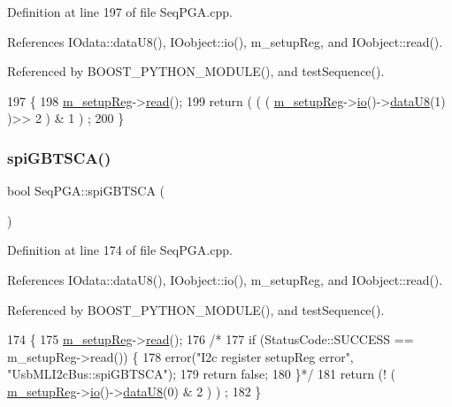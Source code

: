 Definition at line 197 of file Seq\+P\+G\+A.\+cpp.



References I\+Odata\+::data\+U8(), I\+Oobject\+::io(), m\+\_\+setup\+Reg, and I\+Oobject\+::read().



Referenced by B\+O\+O\+S\+T\+\_\+\+P\+Y\+T\+H\+O\+N\+\_\+\+M\+O\+D\+U\+L\+E(), and test\+Sequence().


\begin{DoxyCode}
197                        \{
198   \hyperlink{classSeqPGA_a03269241e7fc26493cd0595beda334c2}{m\_setupReg}->\hyperlink{classIOobject_aa07610c11963b1db6710e3c76ceea456}{read}();
199   \textcolor{keywordflow}{return} ( ( ( \hyperlink{classSeqPGA_a03269241e7fc26493cd0595beda334c2}{m\_setupReg}->\hyperlink{classIOobject_af04fb94137c3d86849f478ac5afab5d1}{io}()->\hyperlink{classIOdata_a75e9c318dbac3a39402179070943d4bc}{dataU8}(1) )>> 2 ) & 1 ) ;
200 \}
\end{DoxyCode}
\mbox{\label{classSeqPGA_a2eadc7868d61ff79ea566b3fbfd977a5}} 
\subsubsection{\texorpdfstring{spi\+G\+B\+T\+S\+C\+A()}{spiGBTSCA()}}
{\footnotesize\ttfamily bool Seq\+P\+G\+A\+::spi\+G\+B\+T\+S\+CA (\begin{DoxyParamCaption}{ }\end{DoxyParamCaption})}



Definition at line 174 of file Seq\+P\+G\+A.\+cpp.



References I\+Odata\+::data\+U8(), I\+Oobject\+::io(), m\+\_\+setup\+Reg, and I\+Oobject\+::read().



Referenced by B\+O\+O\+S\+T\+\_\+\+P\+Y\+T\+H\+O\+N\+\_\+\+M\+O\+D\+U\+L\+E(), and test\+Sequence().


\begin{DoxyCode}
174                        \{
175   \hyperlink{classSeqPGA_a03269241e7fc26493cd0595beda334c2}{m\_setupReg}->\hyperlink{classIOobject_aa07610c11963b1db6710e3c76ceea456}{read}();
176   \textcolor{comment}{/*}
177 \textcolor{comment}{    if (StatusCode::SUCCESS == m\_setupReg->read()) \{}
178 \textcolor{comment}{    error("I2c register setupReg error", "UsbMLI2cBus::spiGBTSCA");}
179 \textcolor{comment}{    return false;}
180 \textcolor{comment}{    \}*/}
181   \textcolor{keywordflow}{return} (! ( \hyperlink{classSeqPGA_a03269241e7fc26493cd0595beda334c2}{m\_setupReg}->\hyperlink{classIOobject_af04fb94137c3d86849f478ac5afab5d1}{io}()->\hyperlink{classIOdata_a75e9c318dbac3a39402179070943d4bc}{dataU8}(0) & 2 ) ) ;
182 \}
\end{DoxyCode}
\mbox{\label{classSeqPGA_ab3d0e5e5d4014bc7a92588a76b8713d4}} 
